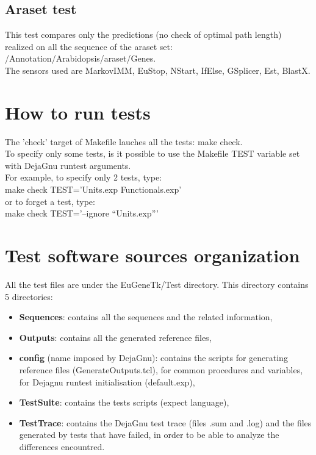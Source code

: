 \documentclass[a4paper,11pt]{article}
\begin{document}
\subsection{Araset test}
This test compares only the predictions (no check of optimal path length) realized on all the sequence of the araset set: /Annotation/Arabidopsis/araset/Genes.\\
The sensors used are MarkovIMM, EuStop, NStart, IfElse, GSplicer, Est, BlastX.\\


\section{How to run tests}
The 'check' target of Makefile lauches all the tests: {\sf make check}.\\
To specify only some tests, is it possible to use the Makefile TEST variable set with DejaGnu runtest arguments.\\
For example, to specify only 2 tests, type: \\
{\sf make check TEST='Units.exp Functionals.exp'} \\
or to forget a test, type: \\
{\sf make check TEST='--ignore ``Units.exp'''}


\section{Test software sources organization}
All the test files are under the EuGeneTk/Test directory.
This directory contains 5 directories:
\begin{itemize}
\item {\bf Sequences}: contains all the sequences and the related information,
\item {\bf Outputs}: contains all the generated reference files,
\item {\bf config} (name imposed by DejaGnu): contains the scripts for generating reference files (GenerateOutputs.tcl), for common procedures and variables, for Dejagnu runtest initialisation (default.exp),
\item {\bf TestSuite}: contains the tests scripts (expect language),
\item {\bf TestTrace}: contains the DejaGnu test trace (files .sum and .log) and the files generated by tests that have failed, in order to be able to analyze the differences encountred.
\end{itemize}
\end{document}

